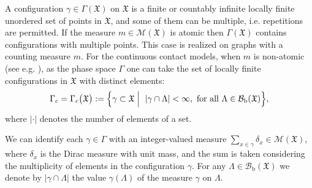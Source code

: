 \documentclass[a4paper,12pt]{article}
\newcommand{\Ga}{\Gamma}
\newcommand{\ga}{\gamma}
\newcommand{\XXX}{{\mathfrak{X}}}
\newcommand{\La}{\Lambda}
\newcommand{\B}{\mathcal{B}}
\newcommand{\M}{\mathcal{M}}
\begin{document}
A configuration $\gamma \in \Ga(\XXX)$ on $\XXX$ is a finite or countably infinite locally finite
unordered set of points in $\XXX$, and some of them can be multiple, i.e. repetitions are permitted.
If the measure $m \in \M(\XXX)$ is atomic then  $\Ga(\XXX)$ contains configurations with multiple points. This case is realized on graphs with a counting measure $m$.
For the continuous contact models, when $m$ is non-atomic (see e.g. \cite{KKP, KKPZ, KS}), as the phase space $\Ga$
one can take the set of locally finite configurations in $\XXX$ with distinct elements:
\begin{equation} \label{confspace}
\Ga_c =\Ga_c\bigl(\XXX\bigr) :=\Bigl\{ \ga \subset \XXX \Bigm| \ | \ga\cap\La| < \infty, \ \mathrm{for \ all } \ \La \in {\B}_{\mathrm{b}}
(\XXX)\Bigr\},
\end{equation}
where $|\cdot|$ denotes the number of elements of a set.

We can identify each $\ga\in\Ga$ with an integer-valued measure $\sum_{x\in
\gamma }\delta_x\in \M(\XXX)$, where $\delta_x$ is
the Dirac measure with unit mass, and the sum is taken considering the multiplicity of elements in the configuration $\gamma$.
For any $ \La \in {\B}_{\mathrm{b}}(\XXX)$ we denote by $|\gamma \cap \La|$ the value $\gamma(\La)$ of the measure $\gamma$ on $\Lambda$.
\end{document}
